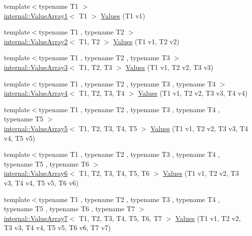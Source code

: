 \begin{DoxyCompactItemize}
\item 
{\footnotesize template$<$typename T1 $>$ }\\\mbox{\hyperlink{classtesting_1_1internal_1_1_value_array1}{internal\+::\+Value\+Array1}}$<$ T1 $>$ \mbox{\hyperlink{namespacetesting_a8209ef59db08b8ad4beed30d8d6e6a88}{Values}} (T1 v1)
\item 
{\footnotesize template$<$typename T1 , typename T2 $>$ }\\\mbox{\hyperlink{classtesting_1_1internal_1_1_value_array2}{internal\+::\+Value\+Array2}}$<$ T1, T2 $>$ \mbox{\hyperlink{namespacetesting_a7cfec131dd8773430fb87483509cc6d0}{Values}} (T1 v1, T2 v2)
\item 
{\footnotesize template$<$typename T1 , typename T2 , typename T3 $>$ }\\\mbox{\hyperlink{classtesting_1_1internal_1_1_value_array3}{internal\+::\+Value\+Array3}}$<$ T1, T2, T3 $>$ \mbox{\hyperlink{namespacetesting_a344ca3522cb99a7b98801a9577993011}{Values}} (T1 v1, T2 v2, T3 v3)
\item 
{\footnotesize template$<$typename T1 , typename T2 , typename T3 , typename T4 $>$ }\\\mbox{\hyperlink{classtesting_1_1internal_1_1_value_array4}{internal\+::\+Value\+Array4}}$<$ T1, T2, T3, T4 $>$ \mbox{\hyperlink{namespacetesting_a4b14d4b6e471a1fb8ee3e5706dbc11c6}{Values}} (T1 v1, T2 v2, T3 v3, T4 v4)
\item 
{\footnotesize template$<$typename T1 , typename T2 , typename T3 , typename T4 , typename T5 $>$ }\\\mbox{\hyperlink{classtesting_1_1internal_1_1_value_array5}{internal\+::\+Value\+Array5}}$<$ T1, T2, T3, T4, T5 $>$ \mbox{\hyperlink{namespacetesting_aa2c5f97a44a14ae95da8313b115b6396}{Values}} (T1 v1, T2 v2, T3 v3, T4 v4, T5 v5)
\item 
{\footnotesize template$<$typename T1 , typename T2 , typename T3 , typename T4 , typename T5 , typename T6 $>$ }\\\mbox{\hyperlink{classtesting_1_1internal_1_1_value_array6}{internal\+::\+Value\+Array6}}$<$ T1, T2, T3, T4, T5, T6 $>$ \mbox{\hyperlink{namespacetesting_a552772c4c4daa68b5e995e0d64651150}{Values}} (T1 v1, T2 v2, T3 v3, T4 v4, T5 v5, T6 v6)
\item 
{\footnotesize template$<$typename T1 , typename T2 , typename T3 , typename T4 , typename T5 , typename T6 , typename T7 $>$ }\\\mbox{\hyperlink{classtesting_1_1internal_1_1_value_array7}{internal\+::\+Value\+Array7}}$<$ T1, T2, T3, T4, T5, T6, T7 $>$ \mbox{\hyperlink{namespacetesting_a8fe9ae088304ebc64de1b076951e6eb8}{Values}} (T1 v1, T2 v2, T3 v3, T4 v4, T5 v5, T6 v6, T7 v7)

\end{DoxyCompactItemize}
